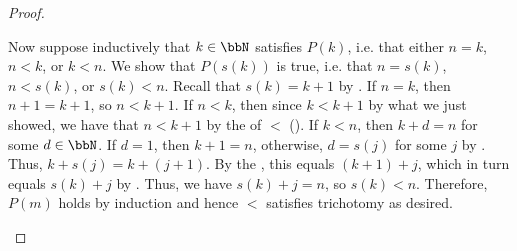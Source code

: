 \begin{proof}
\begin{enumerate}
        Now suppose inductively that $k \in \bbN$ satisfies $P(k)$, i.e. that either $n = k$, $n < k$, or $k < n$. We show that $P(s(k))$ is true, i.e. that $n = s(k)$, $n < s(k)$, or $s(k) < n$. Recall that $s(k) = k+1$ by . If $n = k$, then $n+1 = k+1$, so $n < k+1$. If $n < k$, then since $k < k+1$ by what we just showed, we have that $n < k+1$ by the  of $<$ (). If $k < n$, then $k+d = n$ for some $d \in \bbN$. If $d = 1$, then $k+1 = n$, otherwise, $d = s(j)$ for some $j$ by . Thus, $k+s(j) = k+(j+1)$. By the , this equals $(k+1)+j$, which in turn equals $s(k)+j$ by . Thus, we have $s(k) + j = n$, so $s(k) < n$. Therefore, $P(m)$ holds by induction and hence $<$ satisfies trichotomy as desired.
    \end{enumerate}
\end{proof}
